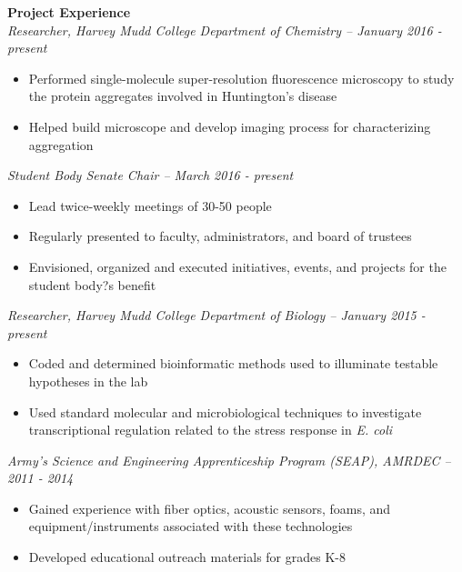 \documentclass[9pt]{article}
\begin{document}
\noindent
{\bf Project Experience \\}
{\it Researcher, Harvey Mudd College Department of Chemistry \--- January 2016 - present}
	\vspace{-2.5mm}
	\begin{itemize}[leftmargin=3.75mm]
		\setlength{\itemsep}{0pt}
    	\setlength{\parskip}{0pt}
    	\setlength{\parsep}{0pt}
		\item Performed single-molecule super-resolution fluorescence 			microscopy to study the protein aggregates involved in 					Huntington's disease
		\item Helped build microscope and develop imaging process for 			characterizing aggregation
	\end{itemize}
\vspace{-1mm}
{\it Student Body Senate Chair \--- March 2016 - present}
	\vspace{-2.5mm}
	\begin{itemize}[leftmargin=3.75mm]
		\setlength{\itemsep}{0pt}
    	\setlength{\parskip}{0pt}
    	\setlength{\parsep}{0pt}
		\item Lead twice-weekly meetings of 30-50 people
		\item Regularly presented to faculty, administrators, and board 		of trustees
		\item Envisioned, organized and executed initiatives, events, 			and	projects for the student body?s benefit
	\end{itemize}
\vspace{-1mm}
{\it Researcher, Harvey Mudd College Department of Biology \--- January 2015 - present}
	\vspace{-2.5mm}
	\begin{itemize}[leftmargin=3.75mm]
		\setlength{\itemsep}{0pt}
    	\setlength{\parskip}{0pt}
    	\setlength{\parsep}{0pt}
		\item Coded and determined bioinformatic methods used to 				illuminate testable hypotheses in the  lab
		\item Used standard molecular and microbiological techniques to 		investigate transcriptional regulation related to the stress 			response in {\it E. coli} 
	\end{itemize}
\vspace{-1mm}
{\it Army's Science and Engineering Apprenticeship Program (SEAP), AMRDEC  \--- 2011 - 2014}
	\vspace{-2.5mm}
	\begin{itemize}[leftmargin=3.75mm]
		\setlength{\itemsep}{0pt}
    	\setlength{\parskip}{0pt}
    	\setlength{\parsep}{0pt}
		\item Gained experience with fiber optics, acoustic sensors, 			foams, and equipment/instruments associated with these 					technologies
		\item Developed educational outreach materials for grades K-8 
	\end{itemize}
\end{document}
